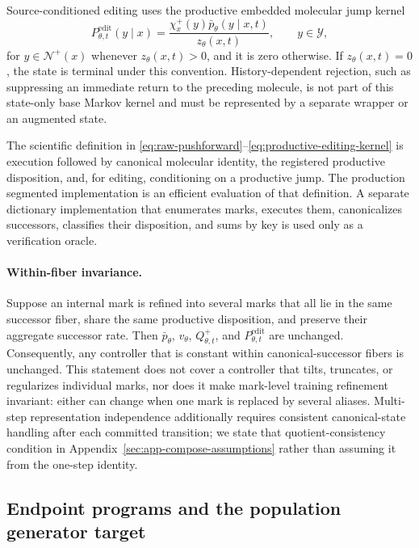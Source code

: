 \documentclass[10pt,letterpaper]{article}
\begin{document}
Source-conditioned editing uses the productive embedded molecular jump
kernel
\begin{equation}
  P_{\theta,t}^{\mathrm{edit}}(y\mid x)
  =
  \frac{\chi_x^+(y)\bar p_\theta(y\mid x,t)}
       {z_\theta(x,t)},
  \qquad y\in\mathcal Y,
  \label{eq:productive-editing-kernel}
\end{equation}
for $y\in\mathcal N^+(x)$ whenever $z_\theta(x,t)>0$, and it is zero
otherwise. If $z_\theta(x,t)=0$, the state is terminal under this convention.
History-dependent rejection, such as suppressing an immediate return to the
preceding molecule, is not part of this state-only base Markov kernel and must
be represented by a separate wrapper or an augmented state.

The scientific definition in
\eqref{eq:raw-pushforward}--\eqref{eq:productive-editing-kernel} is execution
followed by canonical molecular identity, the registered productive
disposition, and, for editing, conditioning on a productive jump. The
production segmented implementation is an efficient evaluation of that
definition. A separate dictionary implementation that enumerates marks,
executes them, canonicalizes successors, classifies their disposition, and
sums by key is used only as a verification oracle.

\paragraph{Within-fiber invariance.}
Suppose an internal mark is refined into several marks that all lie in the
same successor fiber, share the same productive disposition, and preserve
their aggregate successor rate. Then $\bar p_\theta$, $v_\theta$,
$Q_{\theta,t}^{+}$, and $P_{\theta,t}^{\mathrm{edit}}$ are unchanged.
Consequently, any controller that is constant within canonical-successor
fibers is unchanged. This statement does not cover a controller that tilts,
truncates, or regularizes individual marks, nor does it make mark-level
training refinement invariant: either can change when one mark is replaced by
several aliases. Multi-step representation independence additionally requires
consistent canonical-state handling after each committed transition; we state
that quotient-consistency condition in Appendix~\ref{sec:app-compose-assumptions}
rather than assuming it from the one-step identity.

\subsection{Endpoint programs and the population generator target}
\label{sec:population-rgm}
\end{document}

